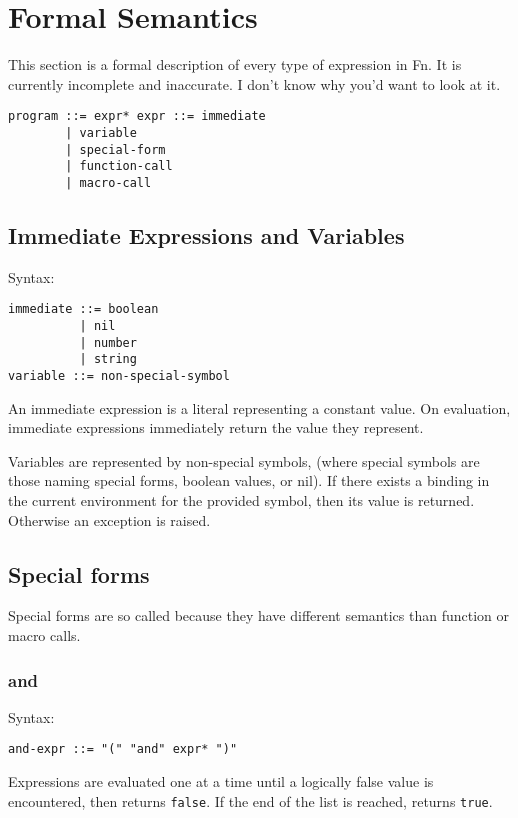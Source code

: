 \documentclass[11pt]{article}
\begin{document}
\section{Formal Semantics}
\label{sec:org24ca7ef}

This section is a formal description of every type of expression in Fn. It is
currently incomplete and inaccurate. I don't know why you'd want to look at it.

\begin{verbatim}
program ::= expr* expr ::= immediate
        | variable
        | special-form
        | function-call
        | macro-call
\end{verbatim}

\subsection{Immediate Expressions and Variables}
\label{sec:org66b2d79}

Syntax:
\begin{verbatim}
immediate ::= boolean 
          | nil
          | number
          | string
variable ::= non-special-symbol
\end{verbatim}

An immediate expression is a literal representing a constant value. On
evaluation, immediate expressions immediately return the value they represent.

Variables are represented by non-special symbols, (where special symbols are
those naming special forms, boolean values, or nil). If there exists a binding
in the current environment for the provided symbol, then its value is returned.
Otherwise an exception is raised.


\subsection{Special forms}
\label{sec:orgccc45ce}

Special forms are so called because they have different semantics than function
or macro calls.

\subsubsection{and}
\label{sec:orgc6e15b7}
Syntax:
\begin{verbatim}
and-expr ::= "(" "and" expr* ")"
\end{verbatim}

Expressions are evaluated one at a time until a logically false value is
encountered, then returns \texttt{false}. If the end of the list is reached, returns
\texttt{true}.
\end{document}
